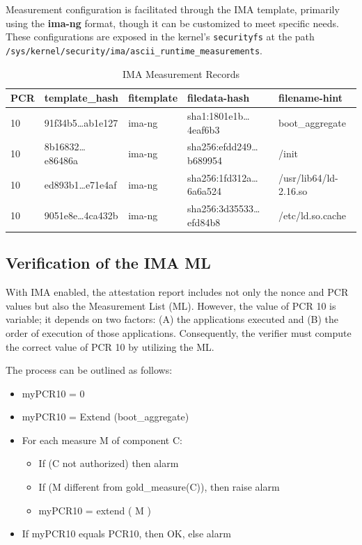 Measurement configuration is facilitated through the IMA template, primarily using the \textbf{ima-ng} format, though it can be customized to meet specific needs. These configurations are exposed in the kernel’s \texttt{securityfs} at the path \texttt{/sys/kernel/security/ima/ascii\_runtime\_measurements}.

\begin{table}[h]
    \centering
    \caption{IMA Measurement Records}
    \bigskip
    \begin{tabular}{@{}lllll@{}}
        \toprule
        \textbf{PCR} & \textbf{template\_hash} & \textbf{fitemplate} & \textbf{filedata-hash} & \textbf{filename-hint} \\ 
        \midrule
        10 & 91f34b5\ldots ab1e127  & ima-ng   & sha1:1801e1b\ldots 4eaf6b3 & boot\_aggregate\\ 
        10 & 8b16832\ldots e86486a & ima-ng  & sha256:efdd249\ldots b689954 & /init\\ 
        10 & ed893b1\ldots e71e4af & ima-ng &  sha256:1fd312a\ldots 6a6a524 & /usr/lib64/ld-2.16.so\\ 
        10 &  9051e8e\ldots 4ca432b & ima-ng & sha256:3d35533\ldots efd84b8 & /etc/ld.so.cache\\ 
        \bottomrule
    \end{tabular}
\end{table}

\subsection{Verification of the IMA ML}


With IMA enabled, the attestation report includes not only the nonce and PCR values but also the Measurement List (ML). However, the value of PCR 10 is variable; it depends on two factors: (A) the applications executed and (B) the order of execution of those applications. Consequently, the verifier must compute the correct value of PCR 10 by utilizing the ML.

The process can be outlined as follows:
\begin{itemize}
    \item myPCR10 = 0
    \item myPCR10 = Extend (boot\_aggregate)
    \item For each measure M of component C:
    \begin{itemize}
        \item If (C not authorized) then  alarm
        \item If (M different from gold\_measure(C)), then raise alarm
        \item myPCR10 = extend ( M )
    \end{itemize}
    \item If myPCR10 equals PCR10, then OK, else alarm
\end{itemize}

